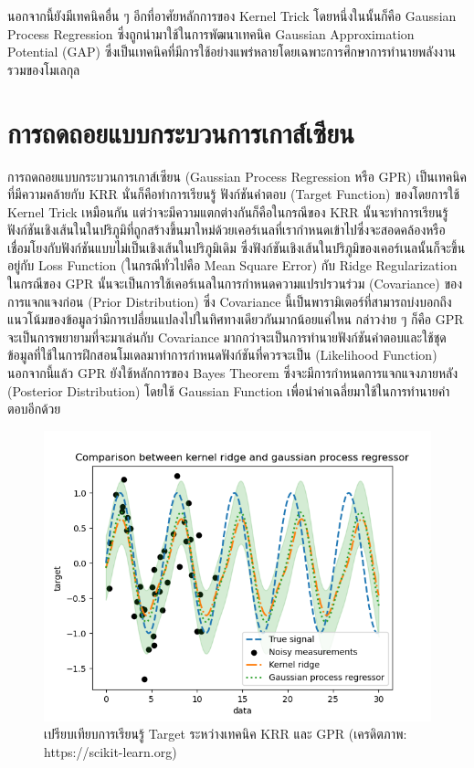 นอกจากนี้ยังมีเทคนิคอื่น ๆ อีกที่อาศัยหลักการของ Kernel Trick โดยหนึ่งในนั้นก็คือ Gaussian Process Regression ซึ่งถูกนำมาใช้ในการพัฒนาเทคนิค Gaussian Approximation Potential (GAP) ซึ่งเป็นเทคนิคที่มีการใช้อย่างแพร่หลายโดยเฉพาะการศึกษาการทำนายพลังงานรวมของโมเลกุล\autocite{bartok2010,bartok2015}

\section{การถดถอยแบบกระบวนการเกาส์เซียน}
\label{sec:gaussian_process}

การถดถอยแบบกระบวนการเกาส์เซียน (Gaussian Process Regression หรือ GPR) เป็นเทคนิคที่มีความคล้ายกับ KRR นั่นก็คือทำการเรียนรู้ ฟังก์ชันคำตอบ (Target Function) ของโดยการใช้ Kernel Trick เหมือนกัน แต่ว่าจะมีความแตกต่างกันก็คือในกรณีของ KRR นั้นจะทำการเรียนรู้ฟังก์ชันเชิงเส้นในในปริภูมิที่ถูกสร้างขึ้นมาใหม่ด้วยเคอร์เนลที่เรากำหนดเข้าไปซึ่งจะสอดคล้องหรือเชื่อมโยงกับฟังก์ชันแบบไม่เป็นเชิงเส้นในปริภูมิเดิม ซึ่งฟังก์ชันเชิงเส้นในปริภูมิของเคอร์เนลนั้นก็จะขึ้นอยู่กับ Loss Function (ในกรณีทั่วไปคือ Mean Square Error) กับ Ridge Regularization ในกรณีของ GPR นั้นจะเป็นการใช้เคอร์เนลในการกำหนดความแปรปรวนร่วม (Covariance) ของการแจกแจงก่อน (Prior Distribution) ซึ่ง Covariance นี้เป็นพารามิเตอร์ที่สามารถบ่งบอกถึงแนวโน้มของข้อมูลว่ามีการเปลี่ยนแปลงไปในทิศทางเดียวกันมากน้อยแค่ไหน กล่าวง่าย ๆ ก็คือ GPR จะเป็นการพยายามที่จะมาเล่นกับ Covariance มากกว่าจะเป็นการทำนายฟังก์ชันคำตอบและใช้ชุดข้อมูลที่ใช้ในการฝึกสอนโมเดลมาทำการกำหนดฟังก์ชันที่ควรจะเป็น (Likelihood Function) นอกจากนี้แล้ว GPR ยังใช้หลักการของ Bayes Theorem ซึ่งจะมีการกำหนดการแจกแจงภายหลัง (Posterior Distribution) โดยใช้ Gaussian Function เพื่อนำค่าเฉลี่ยมาใช้ในการทำนายคำตอบอีกด้วย

\begin{figure}[H]
    \centering
    \includegraphics[width=0.8\linewidth]{fig/plot_gpr_kernel.png}
    \caption{เปรียบเทียบการเรียนรู้ Target ระหว่างเทคนิค KRR และ GPR (เครดิตภาพ: https://scikit-learn.org)}
    \label{fig:krr_gpr}
\end{figure}

